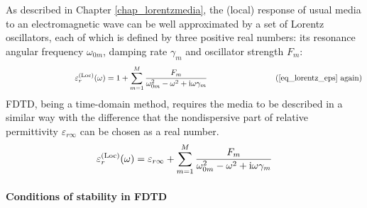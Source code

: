As described in Chapter \ref{chap_lorentzmedia}, the (local) response of usual media to an electromagnetic wave can be well approximated by a set of Lorentz oscillators, each of which is defined by three positive real numbers: its resonance angular frequency $\omega_{0m}$, damping rate $\gamma_m$ and oscillator strength $F_m$: %
$$\hspace{3cm} \epsrl(\omega) = 1 + \sum_{m=1}^M \frac{F_m}{\omega_{0m}^2 - \omega^2 + \ii\omega\gamma_m} \hspace{3cm}\text{(\ref{eq_lorentz_eps} again)}$$
FDTD, being a time-domain method, requires the media to be described in a similar way with the difference that the nondispersive part of relative permittivity $\varepsilon_{r\infty}$ can be chosen as a real number. 
\begin{equation} \varepsilon^{\rm(Loc)}_r(\omega) = \varepsilon_{r\infty} + \sum_{m=1}^M \frac{F_m}{\omega_{0m}^2 - \omega^2 + {\mathrm i}\omega\gamma_m} \label{eq_lorentz_eps_fdtd} \end{equation}






\paragraph{Conditions of stability in FDTD}%

